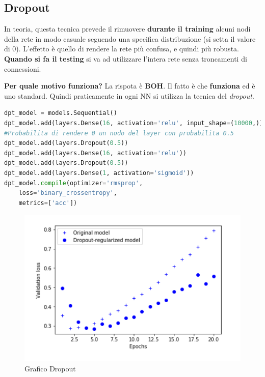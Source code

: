 \subsection{Dropout}
\label{subsec:dropout}

In teoria, questa tecnica prevede il rimuovere \textbf{durante il training} alcuni nodi della rete in modo casuale seguendo 
una specifica distribuzione (si setta il valore di 0). L'effetto è quello di rendere 
la rete più confusa, e quindi più robusta. \textbf{Quando si fa il testing} si va ad utilizzare l'intera rete senza
troncamenti di connessioni.

\textbf{Per quale motivo funziona?} La rispota è \textbf{BOH}. Il fatto è che \textbf{funziona} ed è uno standard. Quindi praticamente 
in ogni NN si utilizza la tecnica del \textit{dropout}.

\begin{lstlisting}[language=Python]
dpt_model = models.Sequential()
dpt_model.add(layers.Dense(16, activation='relu', input_shape=(10000,)))
#Probabilita di rendere 0 un nodo del layer con probabilita 0.5
dpt_model.add(layers.Dropout(0.5))
dpt_model.add(layers.Dense(16, activation='relu'))
dpt_model.add(layers.Dropout(0.5))
dpt_model.add(layers.Dense(1, activation='sigmoid'))
dpt_model.compile(optimizer='rmsprop',
    loss='binary_crossentropy',
    metrics=['acc'])
\end{lstlisting}

\begin{figure}[H]
    \centering
    \includegraphics[scale=0.5]{images/dropout.png}
    \caption{Grafico Dropout}
    \label{fig:dropout}
\end{figure}

